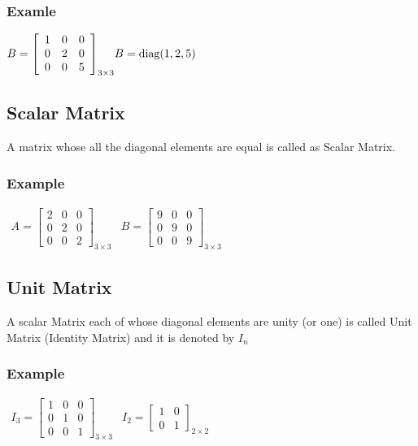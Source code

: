 \documentclass{article}
\begin{document}
	\subsubsection{Examle}
	$ B = {
		\left[ \begin{array}{ccc}
			1 & 0 & 0 \\
			0 & 2 & 0 \\
			0 & 0 & 5
		\end{array}\right]
	}_{3 \times 3} 
	\\ \\
	B = \text{diag}(1, 2, 5)$
	
	\subsection{Scalar Matrix}
	A matrix whose all the diagonal elements are equal is called as Scalar Matrix.
	
	\subsubsection{Example}
	$ \begin{array}{cc}
		A = {
			\left[ \begin{array}{ccc}
				2 & 0 & 0 \\
				0 & 2 & 0 \\
				0 & 0 & 2
			\end{array}\right]
		}_{3 \times 3}
		&
		B = {
			\left[ \begin{array}{ccc}
				9 & 0 & 0 \\
				0 & 9 & 0 \\
				0 & 0 & 9
			\end{array}\right]
		}_{3 \times 3}
	\end{array} $
	
	\subsection{Unit Matrix}
	A scalar Matrix each of whose diagonal elements are unity (or one) is called Unit Matrix (Identity Matrix) and it is denoted by $ I_{n} $
	
	\subsubsection{Example}
	$ \begin{array}{cc}
		I_3 = {
			\left[ \begin{array}{ccc}
				1 & 0 & 0 \\
				0 & 1 & 0 \\
				0 & 0 & 1
			\end{array}\right]
		}_{3 \times 3}
		&
		I_2 = {
			\left[ \begin{array}{cc}
				1 & 0 \\
				0 & 1 
			\end{array}\right]
		}_{2 \times 2}
	\end{array} $
	
\end{document}
